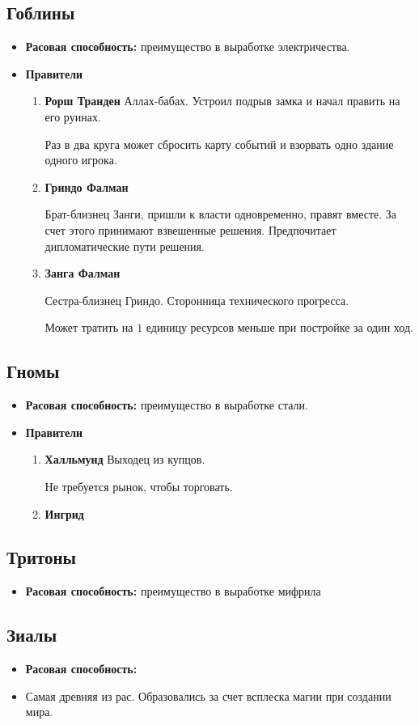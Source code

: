 \documentclass[a4paper,12pt,landscape]{article}
\begin{document}
    \subsection{Гоблины}
    \begin{itemize}
      \item \textbf{Расовая способность:} преимущество в выработке электричества.
      \item \textbf{Правители}
        \begin{enumerate} 
          \item \textbf{Рорш Транден}
          Аллах-бабах. Устроил подрыв замка и начал править на его руинах.

          Раз в два круга может сбросить карту событий и взорвать одно здание одного игрока.
          \item \textbf{Гриндо Фалман}
          
          Брат-близнец Занги, пришли к власти одновременно, правят вместе. За счет этого принимают взвешенные решения. Предпочитает дипломатические пути решения.
          \item \textbf{Занга Фалман}
          
          Сестра-близнец Гриндо. Сторонница технического прогресса.

          Может тратить на $1$ единицу ресурсов меньше при постройке за один ход.
        \end{enumerate}
    \end{itemize}
    
    \subsection{Гномы}
    \begin{itemize}
      \item \textbf{Расовая способность:} преимущество в выработке стали.

      \item \textbf{Правители}
        \begin{enumerate}
          \item \textbf{Халльмунд}
          Выходец из купцов.

          Не требуется рынок, чтобы торговать.
          \item \textbf{Ингрид}
        \end{enumerate}
    \end{itemize}
    
    \subsection{Тритоны}
    \begin{itemize}
      \item \textbf{Расовая способность:} преимущество в выработке мифрила
    \end{itemize}
    
    \subsection{Зиалы}
    \begin {itemize}
      \item \textbf{Расовая способность:} 
      \item Самая древняя из рас. Образовались за счет всплеска магии при создании мира.
    \end{itemize}
\end{document}

